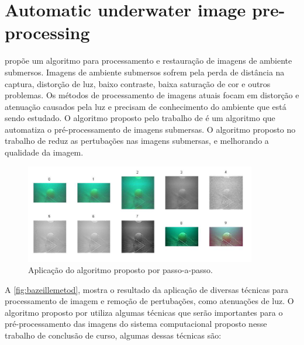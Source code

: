 \section{Automatic underwater image pre-processing}

 propõe um algoritmo para processamento e restauração de imagens de ambiente submersos.  Imagens de ambiente submersos sofrem pela perda de distância na captura, distorção de luz, baixo contraste, baixa saturação de cor e outros problemas. Os métodos de processamento de imagens atuais focam em distorção e atenuação causados pela luz e precisam de conhecimento do ambiente que está sendo estudado. O algoritmo proposto pelo trabalho de  é um algoritmo que automatiza o pré-processamento de imagens submersas. O algoritmo proposto no trabalho de  reduz as pertubações nas imagens submersas, e melhorando a qualidade da imagem.


\begin{figure}[h]
	\caption{\label{fig:bazeillemetod}Aplicação do algoritmo proposto por \cite{bazeille2006} passo-a-passo.}
	\begin{center}
	    \includegraphics[width=0.9\textwidth]{resources/bazeilemetod}
	\end{center}
\end{figure}

A \autoref{fig:bazeillemetod}, mostra o resultado da aplicação de diversas técnicas para processamento de imagem e remoção de pertubações, como atenuações de luz.
% 
O algoritmo proposto por \cite{bazeille2006} utiliza algumas técnicas que serão importantes para o pré-processamento das imagens do sistema computacional proposto nesse trabalho de conclusão de curso, algumas dessas técnicas são:

